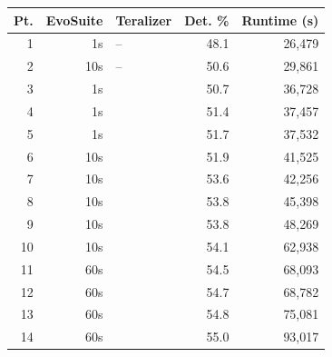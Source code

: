   \begin{tabular}{rrlrr}
  \toprule
  Pt. & EvoSuite & Teralizer & Det. \% & Runtime (s) \\
  \midrule
  1 & 1s & -- & 48.1 & 26,479 \\
  2 & 10s & -- & 50.6 & 29,861 \\
  3 & 1s & \VariantNaiveA{} & 50.7 & 36,728 \\
  4 & 1s & \VariantImprovedB{} & 51.4 & 37,457 \\
  5 & 1s & \VariantNaiveB{} & 51.7 & 37,532 \\
  6 & 10s & \VariantImprovedA{} & 51.9 & 41,525 \\
  7 & 10s & \VariantImprovedB{} & 53.6 & 42,256 \\
  8 & 10s & \VariantNaiveB{} & 53.8 & 45,398 \\
  9 & 10s & \VariantImprovedC{} & 53.8 & 48,269 \\
  10 & 10s & \VariantNaiveC{} & 54.1 & 62,938 \\
  11 & 60s & \VariantImprovedB{} & 54.5 & 68,093 \\
  12 & 60s & \VariantNaiveB{} & 54.7 & 68,782 \\
  13 & 60s & \VariantImprovedC{} & 54.8 & 75,081 \\
  14 & 60s & \VariantNaiveC{} & 55.0 & 93,017 \\
  \bottomrule
  \end{tabular}

